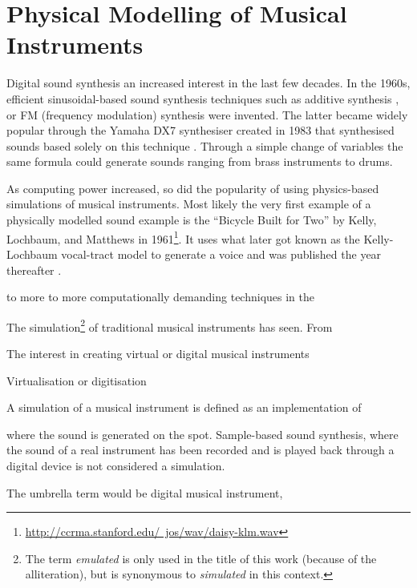 \chapter{Physical Modelling of Musical Instruments}\label{ch:physMod}

Digital sound synthesis an increased interest in the last few decades. In the 1960s, efficient sinusoidal-based sound synthesis techniques such as additive synthesis \cite{additive}, or FM (frequency modulation) synthesis \cite{Chowning1973} were invented. The latter became widely popular through the Yamaha DX7 synthesiser created in 1983 that synthesised sounds based solely on this technique \cite{DX7}. Through a simple change of variables the same formula could generate sounds ranging from brass instruments to drums. 
 
As computing power increased, so did the popularity of using physics-based simulations of musical instruments. Most likely the very first example of a physically modelled sound example is the ``Bicycle Built for Two'' by Kelly, Lochbaum, and Matthews in 1961\footnote{\href{http://ccrma.stanford.edu/~jos/wav/daisy-klm.wav}{http://ccrma.stanford.edu/~jos/wav/daisy-klm.wav}}. It uses what later got known as the Kelly-Lochbaum vocal-tract model to generate a voice and was published the year thereafter \cite{Kelly1962}. 

to more to more computationally demanding techniques in the 

The simulation\footnote{The term \textit{emulated} is only used in the title of this work (because of the alliteration), but is synonymous to \textit{simulated} in this context.} of traditional musical instruments has seen. From 


The interest in creating virtual or digital musical instruments 

Virtualisation or digitisation 

A simulation of a musical instrument is defined as an implementation of 

where the sound is generated on the spot. Sample-based sound synthesis, where the sound of a real instrument has been recorded and is played back through a digital device is not considered a simulation.

The umbrella term would be digital musical instrument,  


